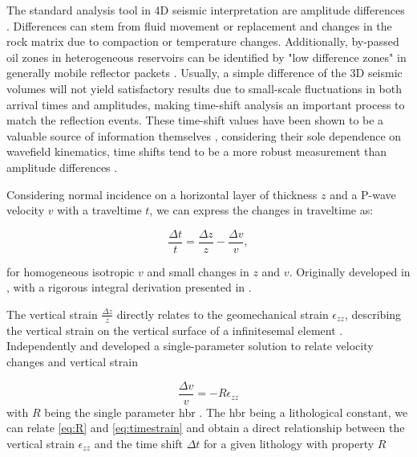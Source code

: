 The standard analysis tool in 4D seismic interpretation are amplitude differences \citep{Johnston2013-jg}. Differences can stem from fluid movement or replacement and changes in the rock matrix due to compaction or temperature changes. Additionally, by-passed oil zones in heterogeneous reservoirs can be identified by "low difference zones" in generally mobile reflector packets \citep{Yilmaz2003-hp}. Usually, a simple difference of the 3D seismic volumes will not yield satisfactory results due to small-scale fluctuations in both arrival times and amplitudes, making time-shift analysis an important process to match the reflection events. These time-shift values have been shown to be a valuable source of information themselves \citep{Hall2002-dt,Hatchell2005-eg}, considering their sole dependence on wavefield kinematics, time shifts tend to be a more robust measurement than amplitude differences \citep{Johnston2013-jg}.

Considering normal incidence on a horizontal layer of thickness $z$ and a P-wave velocity $v$ with a traveltime $t$, we can express the changes in traveltime as:

\begin{equation}
    \frac{\Delta t}{t} = \frac{\Delta z}{z} - \frac{\Delta v}{v},
    \label{eq:timestrain}
\end{equation}

for homogeneous isotropic $v$ and small changes in $z$ and $v$. Originally developed in \citet{Hatchell2005-eg}, with a rigorous integral derivation presented in \citet{macbeth2019post}.

The vertical strain $\frac{\Delta z}{z}$ directly relates to the geomechanical strain $\epsilon_{zz}$, describing the vertical strain on the vertical surface of a infinitesemal element \citep{Herwanger2015-qz}. Independently \citet{Hatchell2005-eg} and \citet{roste2006estimation} developed a single-parameter solution to relate velocity changes and vertical strain

\begin{equation}
    \frac{\Delta v}{v} = - R \epsilon_{zz}
    \label{eq:R}
\end{equation}
with $R$ being the single parameter \ac{hbr} \citep{Hatchell2005-op, macbeth2019post}. The \ac{hbr} being a lithological constant, we can relate \cref{eq:R} and \cref{eq:timestrain} and obtain a direct relationship between the vertical strain $\epsilon_{zz}$ and the time shift $\Delta t$ for a given lithology with property $R$

